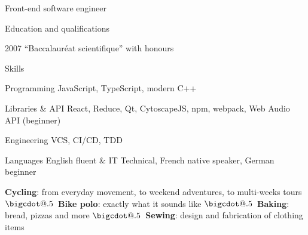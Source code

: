 \documentclass{article}
\makeatletter
\newcommand*\bigcdot{$\mathpalette\bigcdot@{.5}$~}
\newcommand*\bigcdot@[2]{\mathbin{\vcenter{\hbox{\scalebox{#2}{$\m@th#1\bullet$}}}}}
\newcommand{\cvitem}[1]{
\raggedright{
\vskip 3mm
\makebox[\textwidth]{\rule{11mm}{0.4pt} \hskip 2mm {\Large\bf\sc #1} \hskip 2mm \leaders \hrule \hfill}
}
}
\makeatother
\begin{document}
\begin{cv}{Front-end software engineer}
\begin{cvlist}{Education and qualifications}
    \item[2007] ``Baccalauréat scientifique'' with honours
\end{cvlist}


\begin{cvlist}{Skills}
    \item[Programming] JavaScript, TypeScript, modern C++
    \item[Libraries \& API] React, Reduce, Qt, CytoscapeJS, npm, webpack, Web Audio API (beginner)
    \item[Engineering] VCS, CI/CD, TDD
    \item[Languages] English fluent \& IT Technical, French native speaker, German beginner
\end{cvlist}


\cvitem{Interests}
\vskip -1.5mm
  \textbf{Cycling}: from everyday movement, to weekend adventures, to multi-weeks tours
  \bigcdot \textbf{Bike polo}: exactly what it sounds like
  \bigcdot \textbf{Baking}: bread, pizzas and more
  \bigcdot \textbf{Sewing}: design and fabrication of clothing items

\end{cv}
\vfill
\end{document}
